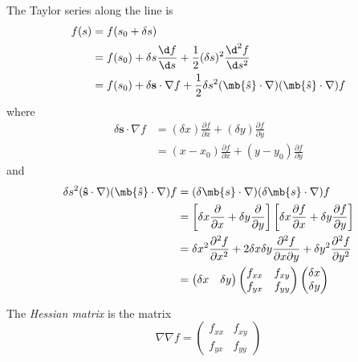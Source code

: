 \documentclass[a4paper]{article}
\begin{document}
  The Taylor series along the line is
  \begin{align*}
    f(s) &= f(s_0 + \delta s)\\
    &=f(s_0) + \delta s\frac{\d f}{\d s} + \frac{1}{2}(\delta s)^2\frac{\d ^2 f}{\d s^2}\\
    &= f(s_0) + \delta \mathbf{s} \cdot \nabla f + \frac{1}{2}\delta s^2 (\mb{\hat{s}}\cdot \nabla)(\mb{\hat{s}}\cdot \nabla)f
  \end{align*}
  where 
  \begin{align*}
    \delta \mathbf{s}\cdot \nabla f &= (\delta x)\frac{\partial f}{\partial x} + (\delta y)\frac{\partial f}{\partial y}\\
    &= (x - x_0)\frac{\partial f}{\partial x} + (y - y_0)\frac{\partial f}{\partial y}
  \end{align*}
  and
  \begin{align*}
    \delta s^2 (\mathbf{\hat{s}}\cdot \nabla)(\mb{\hat{s}}\cdot \nabla)f &= (\delta \mb{s}\cdot \nabla)(\delta \mb{s}\cdot \nabla) f\\
    &= \left[\delta x\frac{\partial }{\partial x} + \delta y\frac{\partial}{\partial y}\right]\left[\delta x\frac{\partial f}{\partial x} + \delta y\frac{\partial f}{\partial y}\right]\\
    &= \delta x^2 \frac{\partial^2 f}{\partial x^2} + 2\delta x\delta y\frac{\partial^2 f}{\partial x\partial y} + \delta y^2 \frac{\partial^2 f}{\partial y^2}\\
    &= 
    \begin{pmatrix}
      \delta x& \delta y
    \end{pmatrix}
    \begin{pmatrix}
      f_{xx}&f_{xy}\\
      f_{yx}&f_{yy}
    \end{pmatrix}
    \begin{pmatrix}
      \delta x\\\delta y
    \end{pmatrix}
  \end{align*}
  \begin{defi}
    The \emph{Hessian matrix} is the matrix
    \[
      \nabla \nabla f =
      \begin{pmatrix}
        f_{xx}&f_{xy}\\
        f_{yx}&f_{yy}
      \end{pmatrix}
    \]
  \end{defi}
\end{document}
